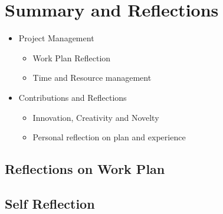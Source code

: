 \documentclass[a4paper]{article}
\begin{document}
\section{Summary and Reflections}
\begin{itemize}
	\item Project Management \begin{itemize}
		\item Work Plan Reflection
		\item Time and Resource management
	\end{itemize}
	\item Contributions and Reflections \begin{itemize}
		\item Innovation, Creativity and Novelty
		\item Personal reflection on plan and experience
	\end{itemize}
\end{itemize}
\subsection{Reflections on Work Plan}
\subsection{Self Reflection}
\end{document}
